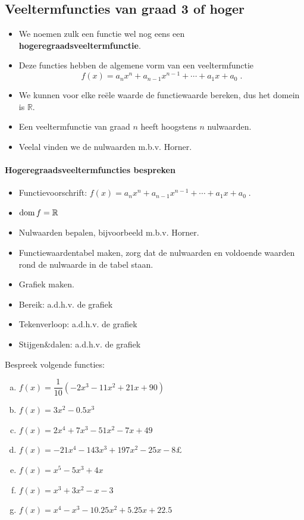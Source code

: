 \documentclass[12pt]{article}
\begin{document}
\begin{theorie}

\pagebreak
\subsection{Veeltermfuncties van graad 3 of hoger}

\begin{itemize}
\item We noemen zulk een functie wel nog eens een {\bf hogeregraadsveeltermfunctie}.
\item Deze functies hebben de algemene vorm van een veeltermfunctie
  $$f(x)= a_nx^n + a_{n-1}x^{n-1} + \cdots + a_1x + a_0\;.$$
\item We kunnen voor elke reële waarde de functiewaarde bereken, dus het domein is $\mathbb{R}$.
\item Een veeltermfunctie van graad $n$ heeft hoogstens $n$ nulwaarden.
\item Veelal vinden we de nulwaarden m.b.v. Horner.
\end{itemize}

\paragraph*{Hogeregraadsveeltermfuncties bespreken}
\begin{mdframed}
  \begin{itemize}
  \item Functievoorschrift: $f(x)= a_nx^n + a_{n-1}x^{n-1} + \cdots + a_1x + a_0\;.$
  \item $\dom f = \mathbb{R}$
  \item Nulwaarden bepalen, bijvoorbeeld m.b.v. Horner.
  \item Functiewaardentabel maken, zorg dat de nulwaarden en voldoende waarden rond de nulwaarde in de tabel staan.
  \item Grafiek maken.
  \item Bereik: a.d.h.v. de grafiek
  \item Tekenverloop: a.d.h.v. de grafiek
  \item Stijgen\&dalen: a.d.h.v. de grafiek
  \end{itemize}
\end{mdframed}

\end{theorie}

\begin{oefening}
  Bespreek volgende functies:
  \begin{enumerate}[(a)]
  \itemsep.5em
  \item $f(x)=\dfrac{1}{10}(-2x^3-11x^2+21x+90)$
  \item $f(x)=3x^2-0.5x^3$
  \item $f(x)=2x^4+7x^3-51x^2-7x+49$
  \item $f(x)=-21x^4-143x^3+197x^2-25x-8$£
  \item $f(x)=x^5-5x^3+4x$
  \item $f(x)=x^3+3x^2-x-3$
  \item $f(x)=x^4-x^3-10.25x^2+5.25x+22.5$
  \end{enumerate}
\end{oefening}
\end{document}
